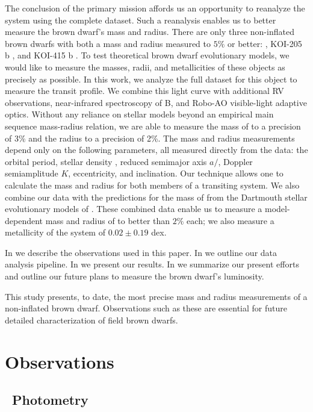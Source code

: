 The conclusion of the primary \itk{} mission affords us an opportunity to reanalyze the \LHS{} system using the complete \itk{} dataset. 
Such a reanalysis enables us to better measure the brown dwarf's mass and radius. 
There are only three non-inflated brown dwarfs with both a mass and radius measured to $5\%$ or better: \LC, KOI-205 b \citep{Diaz13}, and KOI-415 b \citep{Moutou13}.  
To test theoretical brown dwarf evolutionary models, we would like to measure the masses, radii, and metallicities of these objects as precisely as possible. 
In this work, we analyze the full \itk{} dataset for this object to measure the transit profile.
We combine this light curve with additional RV observations, near-infrared spectroscopy of \LA B, and Robo-AO visible-light adaptive optics.
Without any reliance on stellar models beyond an empirical main sequence mass-radius relation, we are able to measure the mass of \LC{} to a precision of 3\% and the radius to a precision of 2\%. 
The mass and radius measurements depend only on the following parameters, all measured directly from the data: the orbital period, stellar density \rhostar, reduced semimajor axis $a/$\rstar, Doppler semiamplitude $K$, eccentricity, and inclination.
Our technique allows one to calculate the mass and radius for both members of a transiting system.
We also combine our data with the predictions for the mass of \LA{} from the Dartmouth stellar evolutionary models of \citet{Dotter08}.
These combined data enable us to measure a model-dependent mass and radius of \LC{} to better than $2\%$ each; we also measure a metallicity of the system of $0.02 \pm 0.19$ dex. 

In  we describe the observations used in this paper. 
In  we outline our data analysis pipeline. 
In  we present our results.
In  we summarize our present efforts and outline our future plans to measure the brown dwarf's luminosity.


This study presents, to date, the most precise mass and radius measurements of a non-inflated brown dwarf. 
Observations such as these are essential for future detailed characterization of field brown dwarfs.



\section{Observations}
\subsection{\itk\ Photometry}

